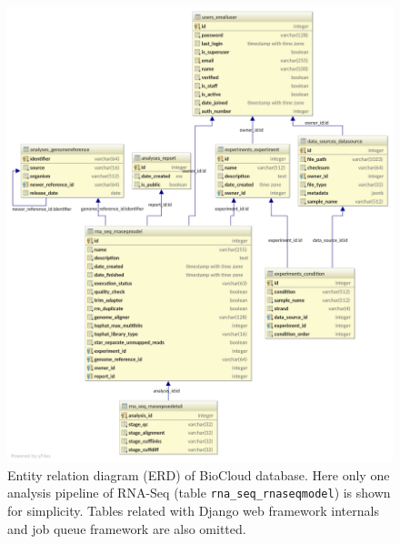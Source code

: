 \begin{figure}[htbp]
\centering
\includegraphics[width=\textwidth]{images/biocloud_erd}
\caption[Entity relation diagram (ERD) of BioCloud database]{
    Entity relation diagram (ERD) of BioCloud database. Here only one analysis
    pipeline of RNA-Seq (table \texttt{rna\_seq\_rnaseqmodel}) is shown for
    simplicity. Tables related with Django web framework internals and job
    queue framework are also omitted.
}
\label{fig:biocloud-erd}
\end{figure}
